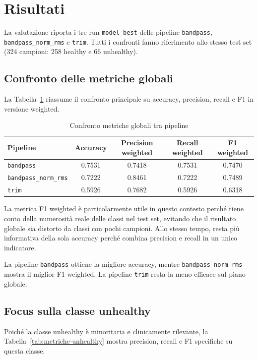 \documentclass[12pt,a4paper]{article}
\begin{document}
\section{Risultati}
La valutazione riporta i tre run \texttt{model\_best} delle pipeline \texttt{bandpass},
\texttt{bandpass\_norm\_rms} e \texttt{trim}. Tutti i confronti fanno riferimento allo stesso test
set (324 campioni: 258 healthy e 66 unhealthy).

\subsection*{Confronto delle metriche globali}
La Tabella~\ref{tab:metriche-globali} riassume il confronto principale su accuracy, precision,
recall e F1 in versione weighted.

\begin{table}[htbp]
    \centering
    \caption{Confronto metriche globali tra pipeline}
    \label{tab:metriche-globali}
    \begin{tabular}{|l|c|c|c|c|}
        \hline
        \textbf{Pipeline} & \textbf{Accuracy} & \textbf{Precision weighted} & \textbf{Recall weighted} & \textbf{F1 weighted} \\
        \hline
        \texttt{bandpass} & 0.7531 & 0.7418 & 0.7531 & 0.7470 \\
        \hline
        \texttt{bandpass\_norm\_rms} & 0.7222 & 0.8461 & 0.7222 & 0.7489 \\
        \hline
        \texttt{trim} & 0.5926 & 0.7682 & 0.5926 & 0.6318 \\
        \hline
    \end{tabular}
\end{table}

La metrica F1 weighted è particolarmente utile in questo contesto perché tiene conto della
numerosità reale delle classi nel test set, evitando che il risultato globale sia distorto da classi
con pochi campioni. Allo stesso tempo, resta più informativa della sola accuracy perché combina
precision e recall in un unico indicatore.

La pipeline \texttt{bandpass} ottiene la migliore accuracy, mentre \texttt{bandpass\_norm\_rms}
mostra il miglior F1 weighted. La pipeline \texttt{trim} resta la meno efficace sul piano globale.

\subsection*{Focus sulla classe unhealthy}
Poiché la classe unhealthy è minoritaria e clinicamente rilevante, la
Tabella~\ref{tab:metriche-unhealthy} mostra precision, recall e F1 specifiche su questa classe.
\end{document}
